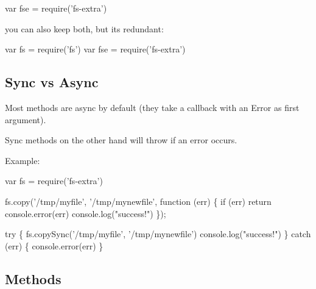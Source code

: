 \begin{DoxyCode}
var fse = require('fs-extra')
\end{DoxyCode}


you can also keep both, but it\textquotesingle{}s redundant\+:


\begin{DoxyCode}
var fs = require('fs')
var fse = require('fs-extra')
\end{DoxyCode}


\subsection*{Sync vs Async }

Most methods are async by default (they take a callback with an {\ttfamily Error} as first argument).

Sync methods on the other hand will throw if an error occurs.

Example\+:


\begin{DoxyCode}
var fs = require('fs-extra')

fs.copy('/tmp/myfile', '/tmp/mynewfile', function (err) \{
  if (err) return console.error(err)
  console.log("success!")
\});

try \{
  fs.copySync('/tmp/myfile', '/tmp/mynewfile')
  console.log("success!")
\} catch (err) \{
  console.error(err)
\}
\end{DoxyCode}


\subsection*{Methods }


